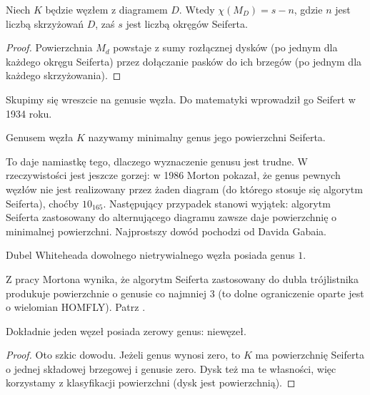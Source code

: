 
\begin{proposition}
    Niech $K$ będzie węzłem z diagramem $D$. Wtedy $\chi(M_D) = s - n$, gdzie $n$ jest liczbą skrzyżowań $D$, zaś $s$ jest liczbą okręgów Seiferta.
\end{proposition}

\begin{proof}
Powierzchnia $M_d$ powstaje z sumy rozłącznej dysków (po jednym dla każdego okręgu Seiferta) przez dołączanie pasków do ich brzegów (po jednym dla każdego skrzyżowania).
\end{proof}

Skupimy się wreszcie na genusie węzła.
Do matematyki wprowadził go Seifert w 1934 roku.

\begin{definition}
    Genusem węzła $K$ nazywamy minimalny genus jego powierzchni Seiferta.
\end{definition}

To daje namiastkę tego, dlaczego wyznaczenie genusu jest trudne.
W rzeczywistości jest jeszcze gorzej: w 1986 Morton pokazał, że genus pewnych węzłów nie jest realizowany przez żaden diagram (do którego stosuje się algorytm Seiferta), choćby $10_{165}$.
Następujący przypadek stanowi wyjątek: algorytm Seiferta zastosowany do alternującego diagramu zawsze daje powierzchnię o minimalnej powierzchni.
Najprostszy dowód pochodzi od Davida Gabaia.

\begin{example}
    Dubel Whiteheada dowolnego nietrywialnego węzła posiada genus $1$.
\end{example}

Z pracy Mortona wynika, że algorytm Seiferta zastosowany do dubla trójlistnika produkuje powierzchnie o genusie co najmniej $3$ (to dolne ograniczenie oparte jest o wielomian HOMFLY).
Patrz \cite{morton86}.

\begin{proposition} \label{genus_one}
    Dokładnie jeden węzeł posiada zerowy genus: niewęzeł.
\end{proposition}

\begin{proof}Oto szkic dowodu.
Jeżeli genus wynosi zero, to $K$ ma powierzchnię Seiferta o jednej składowej brzegowej i genusie zero.
Dysk też ma te własności, więc korzystamy z klasyfikacji powierzchni (dysk jest powierzchnią).
\end{proof}


